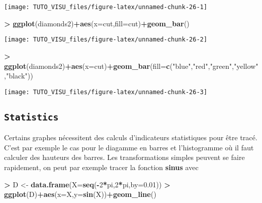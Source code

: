 \documentclass[]{book}
\newenvironment{Shaded}{\begin{snugshade}}{\end{snugshade}}
\newcommand{\DataTypeTok}[1]{\textcolor[rgb]{0.13,0.29,0.53}{#1}}
\newcommand{\DecValTok}[1]{\textcolor[rgb]{0.00,0.00,0.81}{#1}}
\newcommand{\FloatTok}[1]{\textcolor[rgb]{0.00,0.00,0.81}{#1}}
\newcommand{\KeywordTok}[1]{\textcolor[rgb]{0.13,0.29,0.53}{\textbf{#1}}}
\newcommand{\NormalTok}[1]{#1}
\newcommand{\OperatorTok}[1]{\textcolor[rgb]{0.81,0.36,0.00}{\textbf{#1}}}
\newcommand{\StringTok}[1]{\textcolor[rgb]{0.31,0.60,0.02}{#1}}
\theoremstyle{definition}
\theoremstyle{definition}
\theoremstyle{definition}
\theoremstyle{remark}
\begin{document}
\begin{center}\texttt{[image: TUTO\_VISU\_files/figure-latex/unnamed-chunk-26-1]} \end{center}

\begin{Shaded}
\begin{Highlighting}[]
\OperatorTok{>}\StringTok{ }\KeywordTok{ggplot}\NormalTok{(diamonds2)}\OperatorTok{+}\KeywordTok{aes}\NormalTok{(}\DataTypeTok{x=}\NormalTok{cut,}\DataTypeTok{fill=}\NormalTok{cut)}\OperatorTok{+}\KeywordTok{geom_bar}\NormalTok{()}
\end{Highlighting}
\end{Shaded}

\begin{center}\texttt{[image: TUTO\_VISU\_files/figure-latex/unnamed-chunk-26-2]} \end{center}

\begin{Shaded}
\begin{Highlighting}[]
\OperatorTok{>}\StringTok{ }\KeywordTok{ggplot}\NormalTok{(diamonds2)}\OperatorTok{+}\KeywordTok{aes}\NormalTok{(}\DataTypeTok{x=}\NormalTok{cut)}\OperatorTok{+}\KeywordTok{geom_bar}\NormalTok{(}\DataTypeTok{fill=}\KeywordTok{c}\NormalTok{(}\StringTok{"blue"}\NormalTok{,}\StringTok{"red"}\NormalTok{,}\StringTok{"green"}\NormalTok{,}\StringTok{"yellow"}\NormalTok{,}\StringTok{"black"}\NormalTok{))}
\end{Highlighting}
\end{Shaded}

\begin{center}\texttt{[image: TUTO\_VISU\_files/figure-latex/unnamed-chunk-26-3]} \end{center}

\hypertarget{statistics}{%
\subsection{\texorpdfstring{\texttt{Statistics}}{Statistics}}\label{statistics}}

Certains graphes nécessitent des calculs d'indicateurs statistiques pour être tracé. C'est par exemple le cas pour le diagamme en barres et l'histogramme où il faut calculer des hauteurs des barres. Les transformations simples peuvent se faire rapidement, on peut par exemple tracer la fonction \textbf{sinus} avec

\begin{Shaded}
\begin{Highlighting}[]
\OperatorTok{>}\StringTok{ }\NormalTok{D <-}\StringTok{ }\KeywordTok{data.frame}\NormalTok{(}\DataTypeTok{X=}\KeywordTok{seq}\NormalTok{(}\OperatorTok{-}\DecValTok{2}\OperatorTok{*}\NormalTok{pi,}\DecValTok{2}\OperatorTok{*}\NormalTok{pi,}\DataTypeTok{by=}\FloatTok{0.01}\NormalTok{))}
\OperatorTok{>}\StringTok{ }\KeywordTok{ggplot}\NormalTok{(D)}\OperatorTok{+}\KeywordTok{aes}\NormalTok{(}\DataTypeTok{x=}\NormalTok{X,}\DataTypeTok{y=}\KeywordTok{sin}\NormalTok{(X))}\OperatorTok{+}\KeywordTok{geom_line}\NormalTok{()}
\end{Highlighting}
\end{Shaded}
\end{document}
